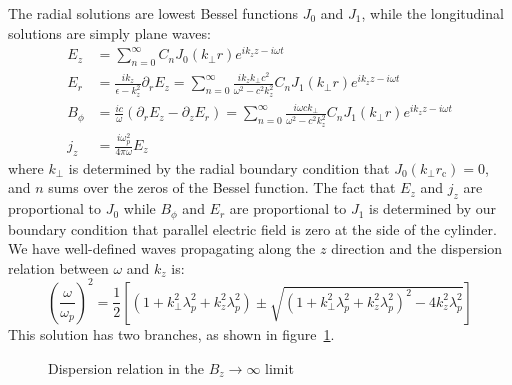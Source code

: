 The radial solutions are lowest Bessel functions $J_0$ and
$J_1$, while the longitudinal solutions are simply plane waves:
\begin{subequations}
    \label{eqn:cyl-waveguide}
    \begin{align}
        E_z &= \sum_{n = 0}^\infty C_nJ_0(k_\perp r)e^{ik_zz - i\omega t} \\
        E_r &= \frac{ik_z}{\epsilon - k_z^2}\partial_r E_z = \sum_{n=0}^\infty \frac{ik_z k_\perp c^2}{\omega^2 - c^2k_z^2}C_nJ_1(k_\perp r)e^{ik_zz - i\omega t} \\
        B_\phi &= \frac{ic}{\omega}(\partial_r E_z - \partial_z E_r) = \sum_{n=0}^\infty \frac{i\omega c k_\perp}{\omega^2 - c^2k_z^2}C_n J_1(k_\perp r)e^{ik_zz - i\omega t} \\
        j_z &= \frac{i\omega_p^2}{4\pi \omega}E_z %
    \end{align}
\end{subequations}
where $k_\perp$ is determined by the radial boundary condition that
$J_0(k_\perp r_\mathrm{c}) = 0$, and $n$ sums over the zeros of the
Bessel function. The fact that $E_z$ and $j_z$ are proportional to
$J_0$ while $B_\phi$ and $E_r$ are proportional to $J_1$ is determined
by our boundary condition that parallel electric field is zero at the
side of the cylinder. We have well-defined waves propagating along the
$z$ direction and the dispersion relation between $\omega$ and $k_z$
is:
\begin{equation}
    \left( \frac{\omega}{\omega_p} \right)^2 = \frac{1}{2}\left[ \left( 1 + k_\perp^2\lambda_p^2 + k_z^2\lambda_p^2 \right) \pm \sqrt{\left( 1 + k_\perp^2\lambda_p^2 + k_z^2\lambda_p^2 \right)^2 - 4k_z^2\lambda_p^2} \right]
    \label{eqn:disp_relation}
\end{equation}
This solution has two branches, as shown in figure~\ref{fig:disp_relation}.
\begin{figure}[h]
    \centering
    \caption{Dispersion relation in the $B_z \to \infty$ limit}
    \label{fig:disp_relation}
\end{figure}
